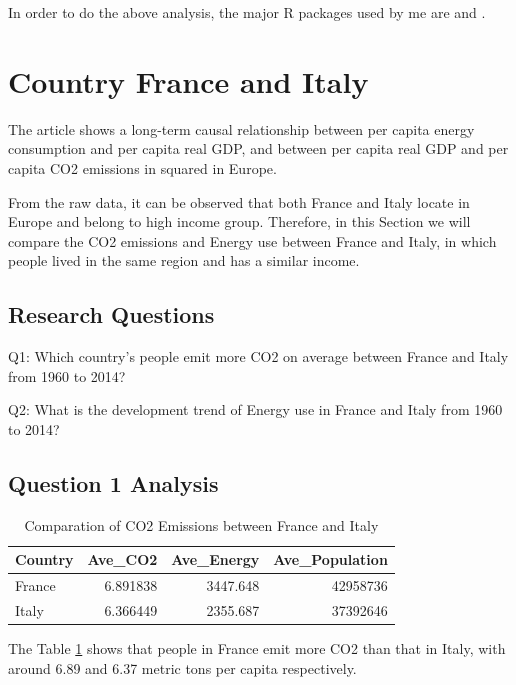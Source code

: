 \documentclass[11pt,a4paper,]{article}
\begin{document}
In order to do the above analysis, the major R packages used by me are \textcite{ggplot2} and \textcite{tidyverse}.

\section*{Country France and Italy}

The article \textcite{ZACHARIADIS2003759} shows a long-term causal relationship between per capita energy consumption and per capita real GDP, and between per capita real GDP and per capita CO2 emissions in squared in Europe.

From the raw data, it can be observed that both France and Italy locate in Europe and belong to high income group. Therefore, in this Section we will compare the CO2 emissions and Energy use between France and Italy, in which people lived in the same region and has a similar income.

\hypertarget{research-questions-1}{%
\subsection{Research Questions}\label{research-questions-1}}

Q1: Which country's people emit more CO2 on average between France and Italy from 1960 to 2014?

Q2: What is the development trend of Energy use in France and Italy from 1960 to 2014?

\hypertarget{question-1-analysis-2}{%
\subsection{Question 1 Analysis}\label{question-1-analysis-2}}

\begin{table}[!h]

\caption{\label{tab:comparation}Comparation of CO2 Emissions between France and Italy}
\centering
\begin{tabular}[t]{lrrr}
\toprule
Country & Ave\_CO2 & Ave\_Energy & Ave\_Population\\
\midrule
France & 6.891838 & 3447.648 & 42958736\\
Italy & 6.366449 & 2355.687 & 37392646\\
\bottomrule
\end{tabular}
\end{table}

The Table \ref{tab:comparation} shows that people in France emit more CO2 than that in Italy, with around 6.89 and 6.37 metric tons per capita respectively.
\end{document}
